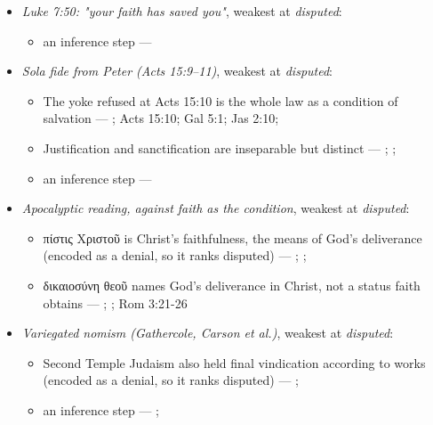\documentclass[11pt]{article}
\begin{document}
\begin{itemize}
\item \emph{Luke 7:50: "your faith has saved you"}, weakest at \emph{disputed}:
\begin{itemize}
\item an inference step --- \cite[Trent, Session VI (1547), canon 9]{tanner-decrees-1990}
\end{itemize}
\item \emph{Sola fide from Peter (Acts 15:9–11)}, weakest at \emph{disputed}:
\begin{itemize}
\item The yoke refused at Acts 15:10 is the whole law as a condition of salvation --- \cite[ad loc. Acts 15:10]{bruce-acts-1988}; Acts 15:10; Gal 5:1; Jas 2:10; \cite{das-paul-law-covenant-2001}
\item Justification and sanctification are inseparable but distinct --- \cite[XIII.1]{westminster-confession-1647}; \cite[XI.1]{westminster-confession-1647}; \cite[III.xi.6]{calvin-institutes-1960}
\item an inference step --- \cite[Trent, Session VI (1547), canon 9]{tanner-decrees-1990}
\end{itemize}
\item \emph{Apocalyptic reading, against faith as the condition}, weakest at \emph{disputed}:
\begin{itemize}
\item πίστις Χριστοῦ is Christ's faithfulness, the means of God's deliverance (encoded as a denial, so it ranks disputed) --- \cite{campbell-deliverance-god-2009}; \cite[ad loc. Gal 2:16]{martyn-galatians-1997}; \cite{hays-faith-jesus-christ-2002}
\item δικαιοσύνη θεοῦ names God's deliverance in Christ, not a status faith obtains --- \cite{campbell-deliverance-god-2009}; \cite{martyn-galatians-1997}; Rom 3:21-26
\end{itemize}
\item \emph{Variegated nomism (Gathercole, Carson et al.)}, weakest at \emph{disputed}:
\begin{itemize}
\item Second Temple Judaism also held final vindication according to works (encoded as a denial, so it ranks disputed) --- \cite{gathercole-where-boasting-2002}; \cite{carson-variegated-nomism-1-2001}
\item an inference step --- \cite{gathercole-where-boasting-2002}; \cite{carson-variegated-nomism-1-2001}
\end{itemize}

\end{itemize}
\end{document}
